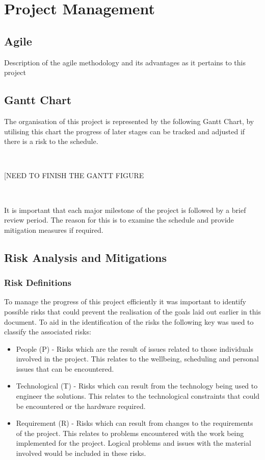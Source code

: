 \documentclass[11pt]{article}  %
\theoremstyle{definition}
\theoremstyle{remark}
\begin{document}
\section{Project Management}\label{ss:back}

\subsection {Agile}

Description of the agile methodology and its advantages as it pertains to this project

\subsection {Gantt Chart}

The organisation of this project is represented by the following Gantt Chart, by utilising this chart the progress of later stages can be tracked and adjusted if there is a risk to the schedule.

\

[NEED TO FINISH THE GANTT FIGURE

\

It is important that each major milestone of the project is followed by a brief review period. The reason for this is to examine the schedule and provide mitigation measures if required.

\subsection {Risk Analysis and Mitigations}

\subsubsection {Risk Definitions}
To manage the progress of this project efficiently it was important to identify possible risks that could prevent the realisation of the goals laid out earlier in this document. To aid in the identification of the risks the following key was used to classify the associated risks:
\begin{itemize}
\item{People (P) - Risks which are the result of issues related to those individuals involved in the project. This relates to the wellbeing, scheduling and personal issues that can be encountered.}
\item{Technological (T) - Risks which can result from the technology being used to engineer the solutions. This relates to the technological constraints that could be encountered or the hardware required.}
\item{Requirement (R)  - Risks which can result from changes to the requirements of the project. This relates to problems encountered with the work being implemented for the project. Logical problems and issues with the material involved would be included in these risks.}
\end{itemize}
\end{document}
